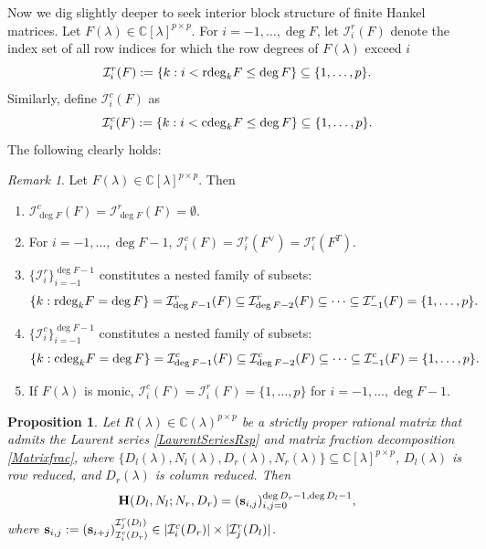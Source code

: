 \documentclass[12pt,reqno]{amsart}
\theoremstyle{plain}
\newtheorem{proposition}[theorem]{Proposition}
\numberwithin{equation}{section}
\theoremstyle{remark}
\newtheorem{remark}[theorem]{Remark}
\begin{document}
Now we dig slightly deeper to seek interior block structure of  finite Hankel matrices.
Let $F(\lambda)\in \mathbb C[\lambda]^{p\times p}$.
For $i=-1,\ldots,\deg F$, let $\mathcal I^r_i(F)$ denote the index set of all row indices for which the row degrees of $F(\lambda)$ exceed $i$
$$
\mathcal I^r_i(F):=\{k:i< {\rm rdeg}_kF\leq \deg F\}\subseteq \{1,\ldots,p\}.
$$
Similarly, define $
\mathcal I^c_i(F)$ as 
$$
\mathcal I^c_i(F):=\{k:i< {\rm cdeg}_kF\leq \deg F\}\subseteq \{1,\ldots,p\}.
$$
The following clearly holds:
\begin{remark}\label{RemIndex}
Let $F(\lambda)\in \mathbb C[\lambda]^{p\times p}$. Then
\begin{enumerate}
\item[{\rm (i)}] $\mathcal I^c_{\deg F}(F)=\mathcal I^r_{\deg F}(F)=\emptyset.$
\item[{\rm (ii)}] For $i=-1,\ldots,\deg F-1$, $\mathcal I^c_i(F)=\mathcal I^r_i(F^{\vee})=\mathcal I^r_i(F^{T}).$
    \item[{\rm (iii)}] $\{{\mathcal I}_i^r\}_{i=-1}^{\deg F-1}$ constitutes a nested family of subsets:
    $$ \{k:{\rm rdeg}_kF=\deg F\}=\mathcal I^r_{\deg F-1}(F)\subseteq \mathcal I^r_{\deg F-2}(F) \subseteq \cdots \subseteq \mathcal I^r_{-1}(F)=\{1,\ldots,p\}.$$
    \item[{\rm (iii)}] $\{{\mathcal I}_i^c\}_{i=-1}^{\deg F-1}$ constitutes a nested family of subsets: $$ \{k:{\rm cdeg}_kF=\deg F\}=\mathcal I^c_{\deg F-1}(F)\subseteq \mathcal I^c_{\deg F-2}(F) \subseteq \cdots \subseteq \mathcal I^c_{-1}(F)=\{1,\ldots,p\}.$$
    \item[{\rm (iv)}] If $F(\lambda)$ is monic, 
    $
\mathcal I^c_{i}(F)=\mathcal I^r_{i}(F)=\{1,\ldots,p\}$ for $i=-1,\ldots,\deg F-1.
    $
\end{enumerate}

\end{remark}


\begin{proposition}\label{LemHs}
Let $R(\lambda)\in \mathbb C(\lambda)^{p\times p}$ be a strictly proper rational matrix that admits the Laurent series \eqref{LaurentSeriesRsp} and matrix fraction decomposition \eqref{Matrixfrac}, where $\{D_l(\lambda), N_l(\lambda),D_r(\lambda), N_r(\lambda)\}\subseteq \mathbb C[\lambda]^{p\times p}$, $D_l(\lambda)$ is row reduced, and $D_r(\lambda)$ is column reduced.
Then \begin{equation}\label{HR}
\mathbf{H}(D_l,N_l;N_r,D_r)=({\bf  s}_{i,j})_{i,j=0}^{\deg D_r-1,\deg D_l-1},
\end{equation}
where ${\bf  s}_{i,j}:=\left({\bf s}_{i+j}\right)_{\mathcal I^c_i(D_r)}^{\mathcal I^r_j(D_l)}\in |\mathcal I^c_i(D_r)|\times |\mathcal I^r_j(D_l)|$.

\end{proposition} 
\end{document}
